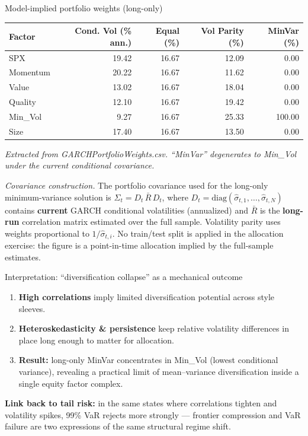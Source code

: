 \documentclass[10pt,aspectratio=169]{beamer}
\newcommand{\sm}{\small}
\newcommand{\xs}{\scriptsize}
\begin{document}
\begin{frame}{Model-implied portfolio weights (long-only)}\sm
\begin{table}
\centering
\small
\begin{tabular}{lrrrr}
\toprule
Factor & Cond. Vol (\% ann.) & Equal (\%) & Vol Parity (\%) & MinVar (\%)\\
\midrule
SPX      & 19.42 & 16.67 & 12.09 & 0.00\\
Momentum & 20.22 & 16.67 & 11.62 & 0.00\\
Value    & 13.02 & 16.67 & 18.04 & 0.00\\
Quality  & 12.10 & 16.67 & 19.42 & 0.00\\
Min\_Vol &  9.27 & 16.67 & 25.33 & 100.00\\
Size     & 17.40 & 16.67 & 13.50 & 0.00\\
\bottomrule
\end{tabular}
\end{table}
\xs\textit{Extracted from GARCHPortfolioWeights.csv. ``MinVar'' degenerates to Min\_Vol under the current conditional covariance.}

\vspace{6pt}
\footnotesize
\emph{Covariance construction.} The portfolio covariance used for the long-only minimum-variance solution is $\Sigma_t = D_t\,\bar{R}\,D_t$, where $D_t=\mathrm{diag}(\hat{\sigma}_{t,1},\dots,\hat{\sigma}_{t,N})$ contains \textbf{current} GARCH conditional volatilities (annualized) and $\bar{R}$ is the \textbf{long-run} correlation matrix estimated over the full sample. Volatility parity uses weights proportional to $1/\hat{\sigma}_{t,i}$. No train/test split is applied in the allocation exercise: the figure is a point-in-time allocation implied by the full-sample estimates.

\end{frame}

\begin{frame}{Interpretation: ``diversification collapse'' as a mechanical outcome}
\sm
\begin{enumerate}
  \item \textbf{High correlations} imply limited diversification potential across style sleeves.
  \item \textbf{Heteroskedasticity \& persistence} keep relative volatility differences in place long enough to matter for allocation.
  \item \textbf{Result:} long-only MinVar concentrates in Min\_Vol (lowest conditional variance), revealing a practical limit of mean--variance diversification inside a single equity factor complex.
\end{enumerate}
\vspace{1mm}
\textbf{Link back to tail risk:} in the same states where correlations tighten and volatility spikes, 99\% VaR rejects more strongly --- frontier compression and VaR failure are two expressions of the same structural regime shift.
\end{frame}
\end{document}
